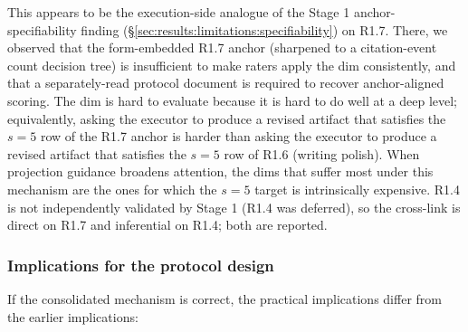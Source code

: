 This appears to be the execution-side analogue of the Stage 1 anchor-specifiability finding (\S\ref{sec:results:limitations:specifiability}) on R1.7. There, we observed that the form-embedded R1.7 anchor (sharpened to a citation-event count decision tree) is insufficient to make raters apply the dim consistently, and that a separately-read protocol document is required to recover anchor-aligned scoring. The dim is hard to evaluate because it is hard to do well at a deep level; equivalently, asking the executor to produce a revised artifact that satisfies the $s = 5$ row of the R1.7 anchor is harder than asking the executor to produce a revised artifact that satisfies the $s = 5$ row of R1.6 (writing polish). When projection guidance broadens attention, the dims that suffer most under this mechanism are the ones for which the $s = 5$ target is intrinsically expensive. R1.4 is not independently validated by Stage 1 (R1.4 was deferred), so the cross-link is direct on R1.7 and inferential on R1.4; both are reported.

\subsubsection{Implications for the protocol design}
\label{sec:results:mechanism:implications}

If the consolidated mechanism is correct, the practical implications differ from the earlier implications:

